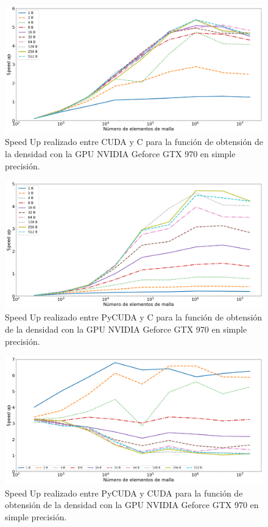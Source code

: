 \begin{figure}[htbp]
	\centering
	\includegraphics[width=\textwidth]{figs/cap4/s_cuda_970_test_simple_10}
	\caption{Speed Up realizado entre CUDA y C para la función de obtensión de la densidad con la GPU NVIDIA Geforce GTX 970 en simple precisión.} 
	\label{fig:s_cuda_970_test_simple_10}	
\end{figure}

\begin{figure}[htbp]
	\centering
	\includegraphics[width=\textwidth]{figs/cap4/s_py_c_970_test_simple_10}
	\caption{Speed Up realizado entre PyCUDA y C para la función de obtensión de la densidad con la GPU NVIDIA Geforce GTX 970 en simple precisión.} 
	\label{fig:s_py_c_970_test_simple_10}	
\end{figure}

\begin{figure}[htbp]
	\centering
	\includegraphics[width=\textwidth]{figs/cap4/s_py_970_test_simple_10}
	\caption{Speed Up realizado entre PyCUDA y CUDA para la función de obtensión de la densidad con la GPU NVIDIA Geforce GTX 970 en simple precisión.} 
	\label{fig:s_py_970_test_simple_10}	
\end{figure}

